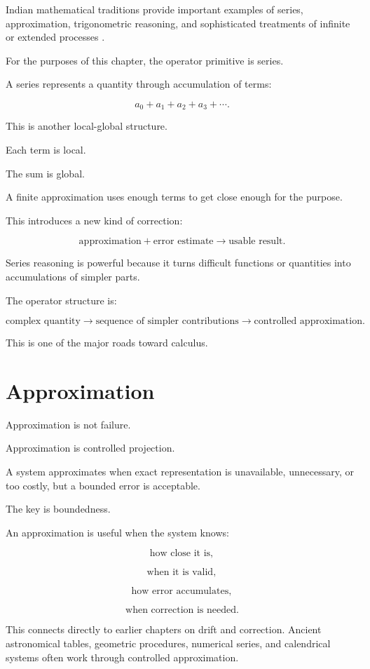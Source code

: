 \documentclass[11pt]{book}
\begin{document}
Indian mathematical traditions provide important examples of series, approximation, trigonometric reasoning, and sophisticated treatments of infinite or extended processes \cite{Plofker2009MathematicsIndia}.

For the purposes of this chapter, the operator primitive is series.

A series represents a quantity through accumulation of terms:

\[
a_0 + a_1 + a_2 + a_3 + \cdots.
\]

This is another local-global structure.

Each term is local.

The sum is global.

A finite approximation uses enough terms to get close enough for the purpose.

This introduces a new kind of correction:

\[
\text{approximation}
+
\text{error estimate}
\rightarrow
\text{usable result}.
\]

Series reasoning is powerful because it turns difficult functions or quantities into accumulations of simpler parts.

The operator structure is:

\[
\text{complex quantity}
\rightarrow
\text{sequence of simpler contributions}
\rightarrow
\text{controlled approximation}.
\]

This is one of the major roads toward calculus.

\section{Approximation}

Approximation is not failure.

Approximation is controlled projection.

A system approximates when exact representation is unavailable, unnecessary, or too costly, but a bounded error is acceptable.

The key is boundedness.

An approximation is useful when the system knows:

\[
\text{how close it is},
\]

\[
\text{when it is valid},
\]

\[
\text{how error accumulates},
\]

\[
\text{when correction is needed}.
\]

This connects directly to earlier chapters on drift and correction. Ancient astronomical tables, geometric procedures, numerical series, and calendrical systems often work through controlled approximation.
\end{document}
